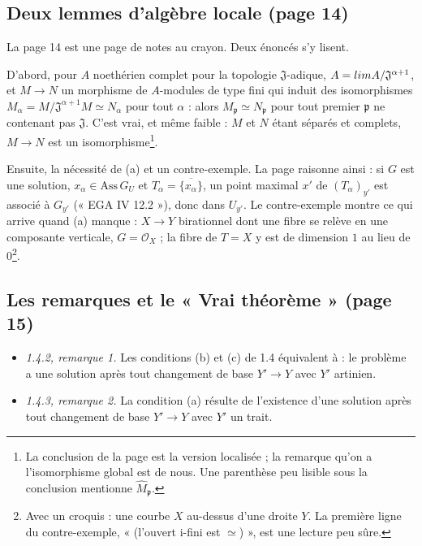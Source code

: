 \documentclass[11pt,a4paper]{article}
\begin{document}
\subsection*{Deux lemmes d'algèbre locale (page 14)}

La page 14 est une page de notes au crayon. Deux énoncés s'y lisent.

D'abord, pour $A$ noethérien complet pour la topologie $\mathfrak{J}$-adique,
$A = \varprojlim A/\mathfrak{J}^{\alpha+1}$, et $M \to N$ un morphisme de
$A$-modules de type fini qui induit des isomorphismes
$M_\alpha = M/\mathfrak{J}^{\alpha+1} M \simeq N_\alpha$ pour tout $\alpha$ :
alors $M_{\mathfrak{p}} \simeq N_{\mathfrak{p}}$ pour tout premier
$\mathfrak{p}$ ne contenant pas $\mathfrak{J}$. C'est vrai, et même faible :
$M$ et $N$ étant séparés et complets, $M \to N$ est un
isomorphisme\footnote{La conclusion de la page est la version localisée ; la
remarque qu'on a l'isomorphisme global est de nous. Une parenthèse peu lisible
sous la conclusion mentionne $\widehat{M}_{\mathfrak{p}}$.}.

Ensuite, la nécessité de (a) et un contre-exemple. La page raisonne ainsi : si $G$ est une solution, $x_\alpha \in
\mathrm{Ass}\, G_U$ et $T_\alpha = \overline{\{x_\alpha\}}$, un point maximal
$x'$ de $(T_\alpha)_{y'}$ est associé à $G_{y'}$ (« EGA IV 12.2 »), donc dans
$U_{y'}$. Le contre-exemple montre ce qui arrive quand (a) manque : $X \to Y$
birationnel dont une fibre se relève en une composante verticale, $G =
\mathcal{O}_X$ ; la fibre de $T = X$ y est de dimension $1$ au lieu de
$0$\footnote{Avec un croquis : une courbe $X$ au-dessus d'une droite $Y$.
La première ligne du contre-exemple, « (l'ouvert i-fini est $\simeq$) », est
une lecture peu sûre.}.

\subsection*{Les remarques et le « Vrai théorème » (page 15)}

\begin{itemize}
  \item \emph{1.4.2, remarque 1.} Les conditions (b) et (c) de 1.4 équivalent
  à : le problème a une solution après tout changement de base $Y' \to Y$ avec
  $Y'$ artinien.
  \item \emph{1.4.3, remarque 2.} La condition (a) résulte de l'existence
  d'une solution après tout changement de base $Y' \to Y$ avec $Y'$ un trait.
\end{itemize}
\end{document}
